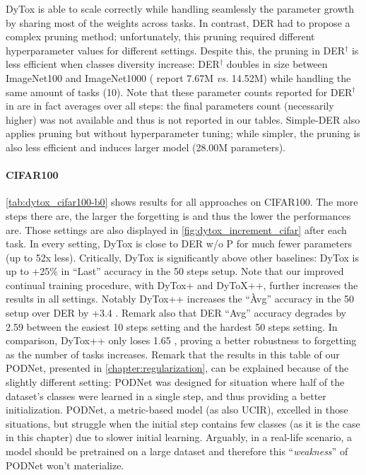 DyTox is able to scale correctly while handling seamlessly the parameter growth by sharing most of
the weights across tasks. In contrast, DER had to propose a complex pruning method; unfortunately,
this pruning required different hyperparameter values for different settings. Despite this, the
pruning in DER$^\dagger$ is less efficient when classes diversity increase: DER$^\dagger$ doubles in
size between ImageNet100 and ImageNet1000 (\citet{yan2021der} report 7.67M \textit{vs.} 14.52M)
while handling the same amount of tasks (10). Note that these parameter counts reported for
DER$^\dagger$ in \citet{yan2021der} are in fact averages over all steps: the final parameters count
(necessarily higher) was not available and thus is not reported in our tables. Simple-DER also
applies pruning but without hyperparameter tuning; while simpler, the pruning is also less efficient
and induces larger model (28.00M parameters).

\paragraph{CIFAR100} \autoref{tab:dytox_cifar100-b0} shows results for all approaches on CIFAR100.
The more steps there are, the larger the forgetting is and thus the lower the performances are.
Those settings are also displayed in \autoref{fig:dytox_increment_cifar} after each task. In every
setting, DyTox is close to DER w/o P  for much fewer parameters (up to 52x less). Critically, DyTox
is significantly above other baselines: \eg DyTox is up to +25\% in ``Last'' accuracy in the 50
steps setup. Note that our improved continual training procedure, with DyTox+ and DyToX++, further
increases the results in all settings. Notably DyTox++ increases the ``Àvg'' accuracy in the 50
setup over DER by +3.4 \pp. Remark also that DER ``Avg'' accuracy degrades by 2.59 \pp between the
easiest 10 steps setting and the hardest 50 steps setting. In comparison, DyTox++ only loses 1.65
\pp, proving a better robustness to forgetting as the number of tasks increases. Remark that the
results in this table of our PODNet, presented in \autoref{chapter:regularization}, can be explained
because of the slightly different setting: PODNet was designed for situation where half of the
dataset's classes were learned in a single step, and thus providing a better initialization. PODNet,
a metric-based model (as also UCIR), excelled in those situations, but struggle when the initial
step contains few classes (as it is the case in this chapter) due to slower initial learning.
Arguably, in a real-life scenario, a model should be pretrained on a large dataset and therefore
this ``\textit{weakness}'' of PODNet won't materialize.

